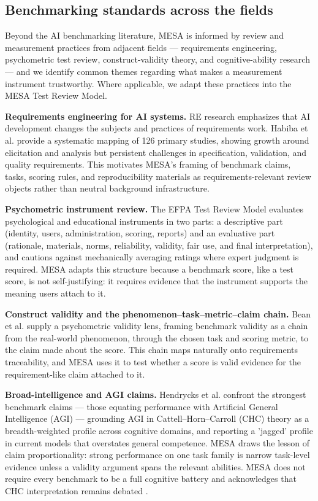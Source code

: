 \documentclass[conference]{IEEEtran}
\begin{document}
    \subsection{Benchmarking standards across the fields}
    
        Beyond the AI benchmarking literature, MESA is informed by review and measurement practices from adjacent fields --- requirements engineering, psychometric test review, construct-validity theory, and cognitive-ability research --- and we identify common themes regarding what makes a measurement instrument trustworthy. Where applicable, we adapt these practices into the MESA Test Review Model.
        
        \textbf{Requirements engineering for AI systems.} RE research emphasizes that AI development changes the subjects and practices of requirements work. Habiba et al. \cite{habiba_re4ai_maturity_2024} provide a systematic mapping of 126 primary studies, showing growth around elicitation and analysis but persistent challenges in specification, validation, and quality requirements. This motivates MESA's framing of benchmark claims, tasks, scoring rules, and reproducibility materials as requirements-relevant review objects rather than neutral background infrastructure.
        
        \textbf{Psychometric instrument review.} The EFPA Test Review Model \cite{efpa_test_review_model_2025} evaluates psychological and educational instruments in two parts: a descriptive part (identity, users, administration, scoring, reports) and an evaluative part (rationale, materials, norms, reliability, validity, fair use, and final interpretation), and cautions against mechanically averaging ratings where expert judgment is required. MESA adapts this structure because a benchmark score, like a test score, is not self-justifying: it requires evidence that the instrument supports the meaning users attach to it.
        
        \textbf{Construct validity and the phenomenon--task--metric--claim chain.} Bean et al. \cite{bean_measuring_what_matters} supply a psychometric validity lens, framing benchmark validity as a chain from the real-world phenomenon, through the chosen task and scoring metric, to the claim made about the score. This chain maps naturally onto requirements traceability, and MESA uses it to test whether a score is valid evidence for the requirement-like claim attached to it.
        
        \textbf{Broad-intelligence and AGI claims.} Hendrycks et al. \cite{hendrycks_definition_agi} confront the strongest benchmark claims --- those equating performance with Artificial General Intelligence (AGI) --- grounding AGI in Cattell--Horn--Carroll (CHC) theory as a breadth-weighted profile across cognitive domains, and reporting a 'jagged' profile in current models that overstates general competence. MESA draws the lesson of claim proportionality: strong performance on one task family is narrow task-level evidence unless a validity argument spans the relevant abilities. MESA does not require every benchmark to be a full cognitive battery and acknowledges that CHC interpretation remains debated \cite{canivez_chc_critique}.
\end{document}
